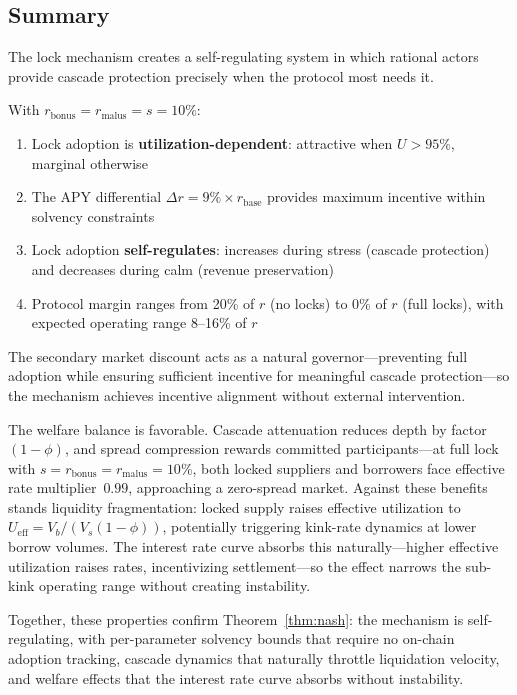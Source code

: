 \documentclass[10pt,a4paper,twocolumn]{article}
\begin{document}
\subsection{Summary}

The lock mechanism creates a self-regulating system in which rational actors provide cascade protection precisely when the protocol most needs it.

\begin{theorem}
\label{thm:nash}
With $r_{\text{bonus}} = r_{\text{malus}} = s = 10\%$:
\begin{enumerate}
    \item Lock adoption is \textbf{utilization-dependent}: attractive when $U > 95\%$, marginal otherwise
    \item The APY differential $\Delta r = 9\% \times r_{\text{base}}$ provides maximum incentive within solvency constraints
    \item Lock adoption \textbf{self-regulates}: increases during stress (cascade protection) and decreases during calm (revenue preservation)
    \item Protocol margin ranges from 20\% of $r$ (no locks) to 0\% of $r$ (full locks), with expected operating range 8--16\% of $r$
\end{enumerate}
\end{theorem}

The secondary market discount acts as a natural governor---preventing full adoption while ensuring sufficient incentive for meaningful cascade protection---so the mechanism achieves incentive alignment without external intervention.

The welfare balance is favorable. Cascade attenuation reduces depth by factor~$(1{-}\phi)$, and spread compression rewards committed participants---at full lock with $s = r_{\text{bonus}} = r_{\text{malus}} = 10\%$, both locked suppliers and borrowers face effective rate multiplier~$0.99$, approaching a zero-spread market. Against these benefits stands liquidity fragmentation: locked supply raises effective utilization to $U_{\text{eff}} = V_b / (V_s(1{-}\phi))$, potentially triggering kink-rate dynamics at lower borrow volumes. The interest rate curve absorbs this naturally---higher effective utilization raises rates, incentivizing settlement---so the effect narrows the sub-kink operating range without creating instability.

Together, these properties confirm Theorem~\ref{thm:nash}: the mechanism is self-regulating, with per-parameter solvency bounds that require no on-chain adoption tracking, cascade dynamics that naturally throttle liquidation velocity, and welfare effects that the interest rate curve absorbs without instability.
\end{document}

